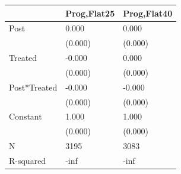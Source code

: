 \begin{tabular}{lll}
\toprule
 & Prog,Flat25 & Prog,Flat40 \\
\midrule
Post & 0.000 & 0.000 \\
 & (0.000) & (0.000) \\
Treated & -0.000 & 0.000 \\
 & (0.000) & (0.000) \\
Post*Treated & -0.000 & -0.000 \\
 & (0.000) & (0.000) \\
Constant & 1.000 & 1.000 \\
 & (0.000) & (0.000) \\
N & 3195 & 3083 \\
R-squared & -inf & -inf \\
\bottomrule
\end{tabular}
